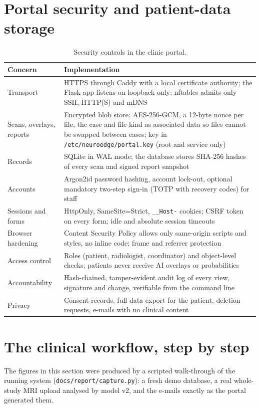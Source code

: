 \documentclass[11pt,a4paper]{article}
\begin{document}
\section{Portal security and patient-data storage}
\begin{table}[H]\centering\small
\begin{tabularx}{\linewidth}{@{}lX@{}}
\toprule
\textbf{Concern} & \textbf{Implementation} \\
\midrule
Transport & HTTPS through Caddy with a local certificate authority; the Flask app listens on loopback only; nftables admits only SSH, HTTP(S) and mDNS \\
Scans, overlays, reports & Encrypted blob store: AES-256-GCM, a 12-byte nonce per file, the case and file kind as associated data so files cannot be swapped between cases; key in \texttt{/etc/neuroedge/portal.key} (root and service only) \\
Records & SQLite in WAL mode; the database stores SHA-256 hashes of every scan and signed report snapshot \\
Accounts & Argon2id password hashing, account lock-out, optional mandatory two-step sign-in (TOTP with recovery codes) for staff \\
Sessions and forms & HttpOnly, SameSite=Strict, \texttt{\_\_Host-} cookies; CSRF token on every form; idle and absolute session timeouts \\
Browser hardening & Content Security Policy allows only same-origin scripts and styles, no inline code; frame and referrer protection \\
Access control & Roles (patient, radiologist, coordinator) and object-level checks; patients never receive AI overlays or probabilities \\
Accountability & Hash-chained, tamper-evident audit log of every view, signature and change, verifiable from the command line \\
Privacy & Consent records, full data export for the patient, deletion requests, e-mails with no clinical content \\
\bottomrule
\end{tabularx}
\caption{Security controls in the clinic portal.}
\end{table}

\section{The clinical workflow, step by step}
The figures in this section were produced by a scripted walk-through of the running system
(\texttt{docs/report/capture.py}): a fresh demo database, a real whole-study MRI upload analysed by model v2, and the
e-mails exactly as the portal generated them.
\end{document}
